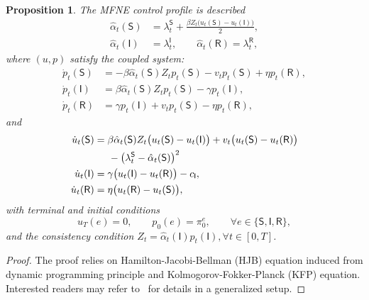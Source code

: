 \documentclass[letterpaper, 10 pt, conference]{ieeeconf}  %
\def\sS{\mathsf{S}}
\def\sI{\mathsf{I}}
\def\sR{\mathsf{R}}
\newtheorem{proposition}[theorem]{Proposition}
\begin{document}
\begin{proposition}
\label{prop:minor_charac}
The MFNE control profile is described
{\small
\begin{equation*}
\label{eq:minor_control}
\begin{aligned}
\hat{\alpha}_t(\sS)&=\lambda_t^{\sS}+\frac{\beta Z_t\big(u_t(\sS)-u_t(\sI)\big)}{2},\\
\hat{\alpha}_t(\sI)&=\lambda_t^{\sI},
\qquad\hat{\alpha}_t(\sR)=\lambda_t^{\sR},
\end{aligned}
\end{equation*}}
where $(u,p)$ satisfy the coupled system:
{\small
\begin{align}
\dot p_t(\sS)&=-\beta\hat{\alpha}_t(\sS)Z_tp_t(\sS)-v_tp_t(\sS)+\eta p_t(\sR),\nonumber\\
\dot p_t(\sI)&=\beta\hat{\alpha}_t(\sS)Z_tp_t(\sS)-\gamma p_t(\sI),\nonumber\\
\dot p_t(\sR)&=\gamma p_t(\sI)+v_tp_t(\sS)-\eta p_t(\sR),\label{eq:minor_KFP}
\end{align}}
and
{\small
\begin{align}
\dot u_t(\sS)&=\beta\hat{\alpha}_t(\sS)Z_t\big(u_t(\sS)-u_t(\sI)\big)+v_t\big(u_t(\sS)-u_t(\sR)\big)\nonumber\\
&\hskip5mm-\big(\lambda_t^{\sS}-\hat{\alpha}_t(\sS)\big)^2\nonumber\\
\dot u_t(\sI)&=\gamma\big(u_t(\sI)-u_t(\sR)\big)-c_{\sI},\nonumber\\
\dot u_t(\sR)&=\eta\big(u_t(\sR)-u_t(\sS)\big),\label{eq:minor_HJB}
\end{align}}
with terminal and initial conditions
{\small
\begin{equation*}
u_T(e)=0,\qquad p_0(e)=\pi_0^e,\qquad \forall e\in\{\sS,\sI,\sR\},
\end{equation*}}
and the consistency condition $Z_t=\hat{\alpha}_t(\sI)p_t(\sI), \forall t\in[0,T]$.
\end{proposition}
\begin{proof}
    The proof relies on Hamilton-Jacobi-Bellman (HJB) equation induced from dynamic programming principle and Kolmogorov-Fokker-Planck (KFP) equation. Interested readers may refer to~\cite{liu2025incorporatingauthorityperceptioneconomic} for details in a generalized setup.
\end{proof}
\end{document}
